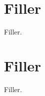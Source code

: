 \documentclass{book}
\begin{document}
\newif\ifplastex
\plastexfalse

\ifplastex
    \usepackage{localdef}
    \maketitle

\newcommand{\myparagraph}[1]{\textbf{#1}}
\newcommand{\mysubparagraph}[1]{\textbf{#1}}
\renewcommand{\paragraph}[1]{\textbf{#1}}
\renewcommand{\subparagraph}[1]{\textbf{#1}}

\newcommand{\tbl}[2]{#2\caption{#1}}


\else


\fi



\makeatletter
\makeatother


\chapter{Filler}
Filler.


\makeatletter
\makeatother


\mainmatter

\chapter{Filler}
Filler.
\end{document}
